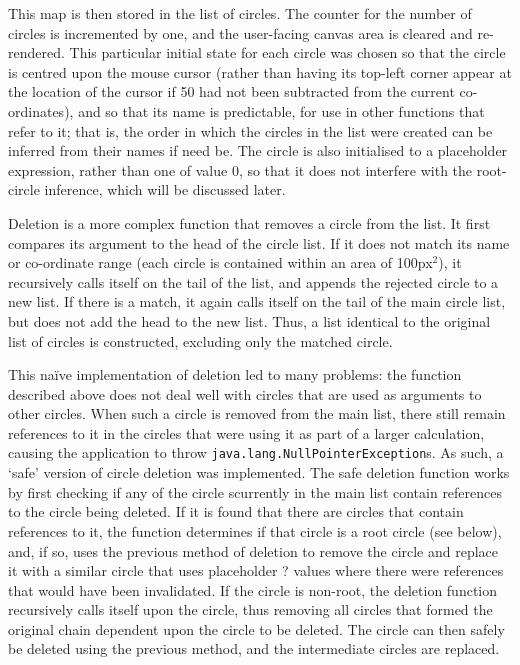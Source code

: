 \documentclass[12pt,twoside,notitlepage,xetex]{report}
\begin{document}
This map is then stored in the list of circles.  The counter for the number of circles is incremented by one, and the user-facing canvas area is cleared and re-rendered.  This particular initial state for each circle was chosen so that the circle is centred upon the mouse cursor (rather than having its top-left corner appear at the location of the cursor if 50 had not been subtracted from the current co-ordinates), and so that its name is predictable, for use in other functions that refer to it; that is, the order in which the circles in the list were created can be inferred from their names if need be.  The circle is also initialised to a placeholder expression, rather than one of value 0, so that it does not interfere with the root-circle inference, which will be discussed later.

Deletion is a more complex function that removes a circle from the list.  It first compares its argument to the head of the circle list.  If it does not match its name or co-ordinate range (each circle is contained within an area of 100px$^2$), it recursively calls itself on the tail of the list, and appends the rejected circle to a new list.  If there is a match, it again calls itself on the tail of the main circle list, but does not add the head to the new list.  Thus, a list identical to the original list of circles is constructed, excluding only the matched circle.

This naïve implementation of deletion led to many problems: the function described above does not deal well with circles that are used as arguments to other circles.  When such a circle is removed from the main list, there still remain references to it in the circles that were using it as part of a larger calculation, causing the application to throw \verb¬java.lang.NullPointerException¬s.  As such, a `safe' version of circle deletion was implemented.  The safe deletion function works by first checking if any of the circle scurrently in the main list contain references to the circle being deleted.  If it is found that there are circles that contain references to it, the function determines if that circle is a root circle (see below), and, if so, uses the previous method of deletion to remove the circle and replace it with a similar circle that uses placeholder {\sfapp ?} values where there were references that would have been invalidated.  If the circle is non-root, the deletion function recursively calls itself upon the circle, thus removing all circles that formed the original chain dependent upon the circle to be deleted.  The circle can then safely be deleted using the previous method, and the intermediate circles are replaced.
\end{document}
